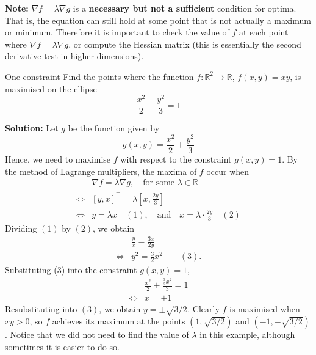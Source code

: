 \documentclass[11pt]{article}
\newcommand{\R}{\mathbb{R}}
\begin{document}
\smallskip
	\noindent \textbf{Note:} \( \nabla f = \lambda\nabla g \) is a \textbf{necessary but not a sufficient} condition for optima. That is, the equation can still hold at some point that is not actually a maximum or minimum. Therefore it is important to check the value of \( f \) at each point where \( \nabla f = \lambda\nabla g \), or compute the Hessian matrix (this is essentially the second derivative test in higher dimensions). 
	\begin{example}{One constraint}{}
			Find the points where the function \( f:\R^2\to\R \), \( f(x, y) = xy \), is maximised on the ellipse
			\[	\frac{x^2}{2} + \frac{y^2}{3} = 1
			\]
		\end{example}
	\noindent \textbf{Solution:} Let \( g \) be the function given by
	\[	g(x, y) = \frac{x^2}{2} + \frac{y^2}{3}
	\]
	Hence, we need to maximise \( f \) with respect to the constraint \( g(x,y) = 1 \).
	By the method of Lagrange multipliers, the maxima of \( f \) occur when 
	\begin{align*}
		     &\nabla f = \lambda\nabla g, \quad\text{for some }\lambda\in\R\\
		\iff & \left[y, x\right]^{\top} = \lambda \left[x, \frac{2y}{3}\right]^{\top} \\
		\iff & y = \lambda x\quad (1), \quad\text{and}\quad x = \lambda\cdot\frac{2y}{3} \quad (2)
	\end{align*}
	Dividing \( (1) \) by \( (2) \), we obtain
	\begin{align*}
		 	 & \frac{y}{x} = \frac{3x}{2y} \\
		\iff & y^2 = \frac{3}{2}x^2\qquad (3).
	\end{align*}
	Substituting (3) into the constraint \( g(x,y) = 1 \), 
	\begin{align*}
			 & \frac{x^2}{2} + \frac{\frac{3}{2} x^2}{3} = 1 \\
		\iff & x = \pm 1
	\end{align*}
	Resubstituting into \( (3) \), we obtain \( y = \pm\sqrt{3/2} \). Clearly \( f \) is maximised when \( xy >0 \), so \( f \) achieves its maximum at the points \( (1, \sqrt{3/2}) \) and \((-1, -\sqrt{3/2})  \). Notice that we did not need to find the value of \( \lambda \) in this example, although sometimes it is easier to do so.\\\\
\end{document}
